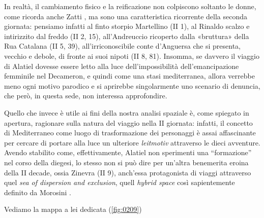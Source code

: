 In realtà, il cambiamento fisico e la reificazione non colpiscono
soltanto le donne, come ricorda anche Zatti \autocite{zatti2004}, ma
sono una caratteristica ricorrente della seconda giornata: pensiamo
infatti al finto storpio Martellino (II 1), al Rinaldo scalzo e
intirizzito dal freddo (II 2, 15), all'Andreuccio ricoperto dalla
«bruttura» della Rua Catalana (II 5, 39), all'irriconoscibile conte
d'Anguersa che si presenta, vecchio e debole, di fronte ai suoi nipoti
(II 8, 81). Insomma, se davvero il viaggio di Alatiel dovesse essere
letto alla luce dell'impossibilità dell'emancipazione femminile nel
Decameron, e quindi come una stasi mediterranea, allora verrebbe meno
ogni motivo parodico e si aprirebbe singolarmente uno scenario di
denuncia, che però, in questa sede, non interessa approfondire.

Quello che invece è utile ai fini della nostra analisi spaziale è, come
spiegato in apertura, ragionare sulla natura del viaggio nella II
giornata: infatti, il concetto di Mediterraneo come luogo di
trasformazione dei personaggi è assai affascinante per cercare di
portare alla luce un ulteriore \emph{leitmotiv} attraverso le dieci
avventure. Avendo stabilito come, effettivamente, Alatiel non sperimenti
una ``formazione'' nel corso della diegesi, lo stesso non si può dire
per un'altra benemerita eroina della II decade, ossia Zinevra (II 9),
anch'essa protagonista di viaggi attraverso quel \emph{sea of dispersion
and exclusion}, quell \emph{hybrid space} così sapientemente definito da
Morosini \autocite{morosini2016}.

Vediamo la mappa a lei dedicata (\ref{fig:0209})
